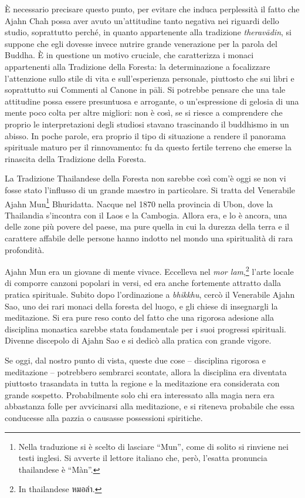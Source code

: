 È necessario precisare questo punto, per evitare che induca perplessità
il fatto che Ajahn Chah possa aver avuto un'attitudine tanto negativa
nei riguardi dello studio, soprattutto perché, in quanto appartenente
alla tradizione \emph{theravādin}, si suppone che egli dovesse invece
nutrire grande venerazione per la parola del Buddha. È in questione un
motivo cruciale, che caratterizza i monaci appartenenti alla Tradizione
della Foresta: la determinazione a focalizzare l'attenzione sullo stile
di vita e sull'esperienza personale, piuttosto che sui libri e
soprattutto sui Commenti al Canone in pāli. Si potrebbe pensare che una
tale attitudine possa essere presuntuosa e arrogante, o un'espressione
di gelosia di una mente poco colta per altre migliori: non è così, se si
riesce a comprendere che proprio le interpretazioni degli studiosi
stavano trascinando il buddhismo in un abisso. In poche parole, era
proprio il tipo di situazione a rendere il panorama spirituale maturo
per il rinnovamento: fu da questo fertile terreno che emerse la
rinascita della Tradizione della Foresta.

La Tradizione Thailandese della Foresta non sarebbe così com'è oggi se
non vi fosse stato l'influsso di un grande maestro in particolare. Si
tratta del Venerabile Ajahn Mun\footnote{Nella traduzione si è scelto di
  lasciare ``Mun'', come di solito si rinviene nei testi inglesi. Si
  avverte il lettore italiano che, però, l'esatta pronuncia thailandese
  è ``Màn''.} Bhuridatta. Nacque nel 1870 nella provincia di Ubon, dove
la Thailandia s'incontra con il Laos e la Cambogia. Allora era, e lo è
ancora, una delle zone più povere del paese, ma pure quella in cui la
durezza della terra e il carattere affabile delle persone hanno indotto
nel mondo una spiritualità di rara profondità.

Ajahn Mun era un giovane di mente vivace. Eccelleva nel \emph{mor
lam},\footnote{In thailandese หมอลำ.} l'arte locale di comporre canzoni
popolari in versi, ed era anche fortemente attratto dalla pratica
spirituale. Subito dopo l'ordinazione a \emph{bhikkhu}, cercò il
Venerabile Ajahn Sao, uno dei rari monaci della foresta del luogo, e gli
chiese di insegnargli la meditazione. Si era pure reso conto del fatto
che una rigorosa adesione alla disciplina monastica sarebbe stata
fondamentale per i suoi progressi spirituali. Divenne discepolo di Ajahn
Sao e si dedicò alla pratica con grande vigore.

Se oggi, dal nostro punto di vista, queste due cose -- disciplina
rigorosa e meditazione -- potrebbero sembrarci scontate, allora la
disciplina era diventata piuttosto trasandata in tutta la regione e la
meditazione era considerata con grande sospetto. Probabilmente solo chi
era interessato alla magia nera era abbastanza folle per avvicinarsi
alla meditazione, e si riteneva probabile che essa conducesse alla
pazzia o causasse possessioni spiritiche.


